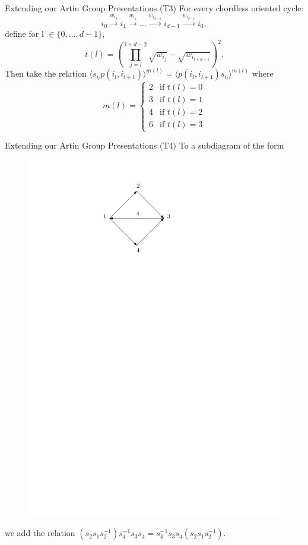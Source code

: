 \documentclass{beamer}
\begin{document}
\begin{frame}{Extending our Artin Group Presentations}
(T3)  For every chordless oriented cycle:
$$i_{0} \stackrel{w_{i_{0}}}{\longrightarrow} i_{1} \stackrel{w_{i_{1}}}{\longrightarrow} \dots \stackrel{w_{i_{d-2}}}{\longrightarrow} i_{d-1} \stackrel{w_{i_{d-1}}}{\longrightarrow} i_{0},$$
define for l $\in \{0, \dots, d-1\}$, 
$$t(l) = (\prod_{j=l}^{l+d-2}{\sqrt{w_{i_{j}}}} - \sqrt{w_{i_{l+d-1}}})^{2}.$$
Then take the relation $\langle s_{i_{l}}p(i_{l}, i_{l+1}) \rangle^{m(l)} = \langle p(i_{l}, i_{l+1})s_{i_{l}} \rangle^{m(l)}$ where
$$m(l) =
\begin{cases}
2 &\text{if $t(l)=0$} \\
3 &\text{if $t(l)=1$} \\
4 &\text{if $t(l)=2$} \\
6 &\text{if $t(l)=3$}
\end{cases}$$
\end{frame}

\begin{frame}{Extending our Artin Group Presentations}
(T4) To a subdiagram of the form
\begin{figure}
\includegraphics[scale = .50]{Diagram1.pdf}
\end{figure}
we add the relation $(s_{2}s_{1}s_{2}^{-1})s_{4}^{-1}s_{3}s_{4} = s_{4}^{-1}s_{3}s_{4}(s_{2}s_{1}s_{2}^{-1}).$
\end{frame}
\end{document}
